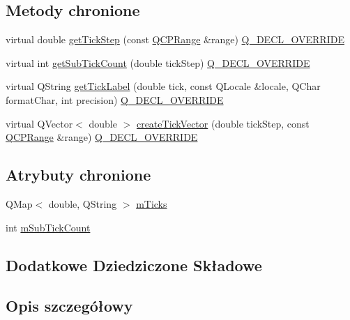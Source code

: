 \subsection*{Metody chronione}
\begin{DoxyCompactItemize}
\item 
virtual double \hyperlink{class_q_c_p_axis_ticker_text_a628f16c41905e8c95c6622d6757a38c4}{get\+Tick\+Step} (const \hyperlink{class_q_c_p_range}{Q\+C\+P\+Range} \&range) \hyperlink{qcustomplot_8hh_a42cc5eaeb25b85f8b52d2a4b94c56f55}{Q\+\_\+\+D\+E\+C\+L\+\_\+\+O\+V\+E\+R\+R\+I\+DE}
\item 
virtual int \hyperlink{class_q_c_p_axis_ticker_text_a9c2488b877776870239abda4c8106052}{get\+Sub\+Tick\+Count} (double tick\+Step) \hyperlink{qcustomplot_8hh_a42cc5eaeb25b85f8b52d2a4b94c56f55}{Q\+\_\+\+D\+E\+C\+L\+\_\+\+O\+V\+E\+R\+R\+I\+DE}
\item 
virtual Q\+String \hyperlink{class_q_c_p_axis_ticker_text_a99247779a9c20bea1f50911117540a71}{get\+Tick\+Label} (double tick, const Q\+Locale \&locale, Q\+Char format\+Char, int precision) \hyperlink{qcustomplot_8hh_a42cc5eaeb25b85f8b52d2a4b94c56f55}{Q\+\_\+\+D\+E\+C\+L\+\_\+\+O\+V\+E\+R\+R\+I\+DE}
\item 
virtual Q\+Vector$<$ double $>$ \hyperlink{class_q_c_p_axis_ticker_text_aa195c4fd0364d0393f1798fb495d6a60}{create\+Tick\+Vector} (double tick\+Step, const \hyperlink{class_q_c_p_range}{Q\+C\+P\+Range} \&range) \hyperlink{qcustomplot_8hh_a42cc5eaeb25b85f8b52d2a4b94c56f55}{Q\+\_\+\+D\+E\+C\+L\+\_\+\+O\+V\+E\+R\+R\+I\+DE}
\end{DoxyCompactItemize}
\subsection*{Atrybuty chronione}
\begin{DoxyCompactItemize}
\item 
Q\+Map$<$ double, Q\+String $>$ \hyperlink{class_q_c_p_axis_ticker_text_a27c48539feb6c293979cd8059ba220c3}{m\+Ticks}
\item 
int \hyperlink{class_q_c_p_axis_ticker_text_a206d092b1598eecb981bba7fb16ff44e}{m\+Sub\+Tick\+Count}
\end{DoxyCompactItemize}
\subsection*{Dodatkowe Dziedziczone Składowe}


\subsection{Opis szczegółowy}


